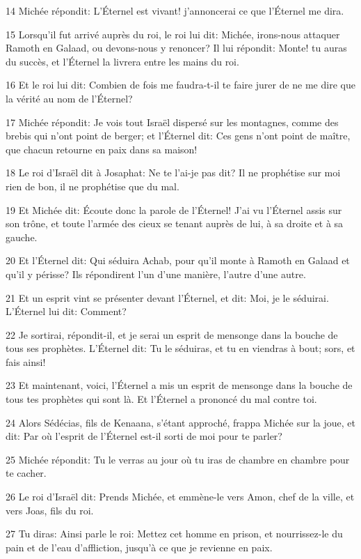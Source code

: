 \par 14 Michée répondit: L'Éternel est vivant! j'annoncerai ce que l'Éternel me dira.
\par 15 Lorsqu'il fut arrivé auprès du roi, le roi lui dit: Michée, irons-nous attaquer Ramoth en Galaad, ou devons-nous y renoncer? Il lui répondit: Monte! tu auras du succès, et l'Éternel la livrera entre les mains du roi.
\par 16 Et le roi lui dit: Combien de fois me faudra-t-il te faire jurer de ne me dire que la vérité au nom de l'Éternel?
\par 17 Michée répondit: Je vois tout Israël dispersé sur les montagnes, comme des brebis qui n'ont point de berger; et l'Éternel dit: Ces gens n'ont point de maître, que chacun retourne en paix dans sa maison!
\par 18 Le roi d'Israël dit à Josaphat: Ne te l'ai-je pas dit? Il ne prophétise sur moi rien de bon, il ne prophétise que du mal.
\par 19 Et Michée dit: Écoute donc la parole de l'Éternel! J'ai vu l'Éternel assis sur son trône, et toute l'armée des cieux se tenant auprès de lui, à sa droite et à sa gauche.
\par 20 Et l'Éternel dit: Qui séduira Achab, pour qu'il monte à Ramoth en Galaad et qu'il y périsse? Ils répondirent l'un d'une manière, l'autre d'une autre.
\par 21 Et un esprit vint se présenter devant l'Éternel, et dit: Moi, je le séduirai. L'Éternel lui dit: Comment?
\par 22 Je sortirai, répondit-il, et je serai un esprit de mensonge dans la bouche de tous ses prophètes. L'Éternel dit: Tu le séduiras, et tu en viendras à bout; sors, et fais ainsi!
\par 23 Et maintenant, voici, l'Éternel a mis un esprit de mensonge dans la bouche de tous tes prophètes qui sont là. Et l'Éternel a prononcé du mal contre toi.
\par 24 Alors Sédécias, fils de Kenaana, s'étant approché, frappa Michée sur la joue, et dit: Par où l'esprit de l'Éternel est-il sorti de moi pour te parler?
\par 25 Michée répondit: Tu le verras au jour où tu iras de chambre en chambre pour te cacher.
\par 26 Le roi d'Israël dit: Prends Michée, et emmène-le vers Amon, chef de la ville, et vers Joas, fils du roi.
\par 27 Tu diras: Ainsi parle le roi: Mettez cet homme en prison, et nourrissez-le du pain et de l'eau d'affliction, jusqu'à ce que je revienne en paix.
